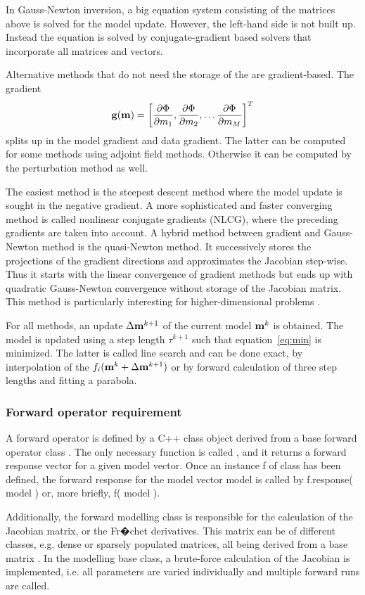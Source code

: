 In Gauss-Newton inversion, a big equation system consisting of the matrices above is solved for the model update.
However, the left-hand side is not built up. 
Instead the equation is solved by conjugate-gradient based solvers that incorporate all matrices and vectors.

Alternative methods that do not need the storage of the are gradient-based.
The gradient 
\[ \mathbf{g}(\mathbf{m}) = \left[ \frac{\partial \Phi}{\partial m_1}, \frac{\partial \Phi}{\partial m_2}, \ldots \frac{\partial \Phi}{\partial m_M} \right]^T \]
splits up in the model gradient and data gradient.
The latter can be computed for some methods using adjoint field methods.
Otherwise it can be computed by the perturbation method as well.

The easiest method is the steepest descent method where the model update is sought in the negative gradient.
A more sophisticated and faster converging method is called nonlinear conjugate gradients (NLCG), where the preceding gradients are taken into account.
A hybrid method between gradient and Gauss-Newton method is the quasi-Newton method.
It successively stores the projections of the gradient directions and approximates the Jacobian step-wise.
Thus it starts with the linear convergence of gradient methods but ends up with quadratic Gauss-Newton convergence without storage of the Jacobian matrix.
This method is particularly interesting for higher-dimensional problems \citep{haber05}.

For all methods, an update $\Delta\mathbf{m}^{k+1}$ of the current model $\mathbf{m}^k$ is obtained.
The model is updated using a step length  $\tau^{k+1}$ such that equation~\ref{eq:min} is minimized.
The latter is called line search and can be done exact, by interpolation of the $f_i(\mathbf{m}^k+\Delta\mathbf{m}^{k+1})$ or by forward calculation of three step lengths and fitting a parabola.

\subsubsection*{Forward operator requirement}\label{sec:forward}
A forward operator is defined by a C++ class object derived from a base forward operator class .
The only necessary function is called , and it returns a forward response vector for a given model vector.
Once an instance f of class has been defined, the forward response for the model vector model is called by f.response( model ) or, more briefly, f( model ).

Additionally, the forward modelling class is responsible for the calculation of the Jacobian matrix, or the Fr�chet derivatives.
This matrix can be of different classes, e.g. dense or sparsely populated matrices, all being derived from a base matrix .
In the modelling base class, a brute-force calculation of the Jacobian is implemented, i.e. all parameters are varied individually and multiple forward runs are called.

